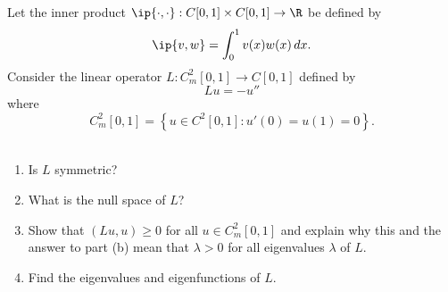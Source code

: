 
Let the inner product $\ip{\cdot,\cdot}:C[0,1]\times C[0,1]\to\R$ be defined by
\[
\ip{v,w}=\int_0^1v(x)w(x)\,dx.
\]
Consider the linear operator $L:C_m^2[0,1] \to C[0,1]$ defined by
\[
L u = -u''
\]
where 
\[
C_m^2[0,1] = \left\{ u\in C^2[0,1]: u'(0) = u(1) = 0\right\}.
\]
\\
\begin{enumerate}
\item Is $L$ symmetric?
\\
\item What is the null space of $L$?
\\
\item Show that $(L u,u)\ge 0$ for all $u\in C_m^2[0,1]$ and explain why this and the answer to part (b) mean that $\lambda > 0$ for all eigenvalues $\lambda$ of $L$.
\\
\item Find the eigenvalues and eigenfunctions of $L$.
\end{enumerate}




